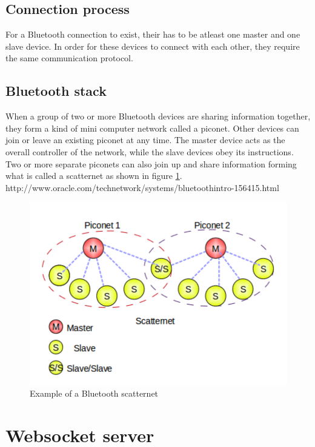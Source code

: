 \documentclass[a4paper, 11pt]{report}
\begin{document}
\subsection{Connection process}
For a Bluetooth connection to exist, their has to be atleast one master and one slave device. In order for these devices to connect with each other, they require the same communication protocol.

\subsection{Bluetooth stack}
When a group of two or more Bluetooth devices are sharing information together, they form a kind of mini computer network called a piconet. Other devices can join or leave an existing piconet at any time. The master device acts as the overall controller of the network, while the slave devices obey its instructions. Two or more separate piconets can also join up and share information forming what is called a scatternet as shown in figure \ref{fig:scatternet}.
http://www.oracle.com/technetwork/systems/bluetoothintro-156415.html

\begin{figure}[hbtp]
\centering
\includegraphics[scale=0.6]{images/scatternet.pdf}
\caption{Example of a Bluetooth scatternet}\label{fig:scatternet}
\end{figure}

	\section{Websocket server}






\end{document}
